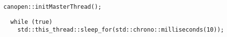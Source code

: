 \begin{verbatim}
canopen::initMasterThread();
\end{verbatim}




\begin{verbatim}
  while (true)
    std::this_thread::sleep_for(std::chrono::milliseconds(10));
\end{verbatim}

    

 




